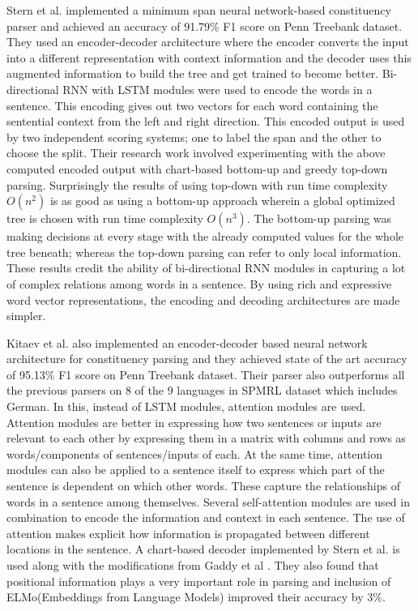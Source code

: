 \documentclass[a4paper, 11pt]{article}
\begin{document}
Stern et al. \parencite*{Stern2017} implemented a minimum span neural network-based constituency parser and achieved an accuracy of 91.79\% F1 score on Penn Treebank dataset. They used an encoder-decoder architecture where the encoder converts the input into a different representation with context information and the decoder uses this augmented information to build the tree and get trained to become better. Bi-directional RNN with LSTM \parencite{schuster1997} modules were used to encode the words in a sentence. This encoding gives out two vectors for each word containing the sentential context from the left and right direction. This encoded output is used by two independent scoring systems; one to label the span and the other to choose the split. Their research work involved experimenting with the above computed encoded output with chart-based bottom-up and greedy top-down parsing. Surprisingly the results of using top-down with run time complexity $O(n^2)$ is as good as using a bottom-up approach wherein a global optimized tree is chosen with run time complexity $O(n^3)$. The bottom-up parsing was making decisions at every stage with the already computed values for the whole tree beneath; whereas the top-down parsing can refer to only local information. These results credit the ability of bi-directional RNN modules in capturing a lot of complex relations among words in a sentence. By using rich and expressive word vector representations, the encoding and decoding architectures are made simpler. 

Kitaev et al. \parencite*{Kitaev2019} also implemented an encoder-decoder based neural network architecture for constituency parsing and they achieved state of the art accuracy of 95.13\% F1 score on Penn Treebank dataset. Their parser also outperforms all the previous parsers on 8 of the 9 languages in SPMRL dataset which includes German. In this, instead of LSTM modules, attention modules \parencite*{Vaswani2017} are used. Attention modules are better in expressing how two sentences or inputs are relevant to each other by expressing them in a matrix with columns and rows as words/components of sentences/inputs of each. At the same time, attention modules can also be applied to a sentence itself to express which part of the sentence is dependent on which other words. These capture the relationships of words in a sentence among themselves. Several self-attention modules are used in combination to encode the information and context in each sentence. The use of attention makes explicit how information is propagated between different locations in the sentence. A chart-based decoder implemented by Stern et al. \parencite*{Stern2017} is used along with the modifications from Gaddy et al \parencite*{Gaddy2018}. They also found that positional information plays a very important role in parsing and inclusion of ELMo(Embeddings from Language Models) improved their accuracy by 3\%. 
\end{document}
